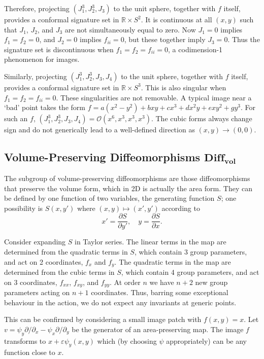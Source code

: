 \documentclass[review,onefignum,onetabnum]{siamonline190516}
\def\R{\mathbb{R}}
\begin{document}
{Therefore, projecting $(J_1^3,J_2^3,J_3)$ to the unit sphere, together with $f$ itself, provides a conformal signature set in $\R\times S^2$. It is continuous at all $(x,y)$ such that $J_1$, $J_2$, and $J_3$ are not simultaneously equal to zero.  Now $J_1=0$ implies $f_1=f_2=0$, and $J_2=0$ implies $f_{ii}=0$, but these together imply $J_3=0$. Thus the signature set is discontinuous when $f_1=f_2=f_{ii}=0$, a codimension-1 phenomenon for images.

Similarly, projecting $(J_1^3,J_2^3,J_3,J_4)$ to the unit sphere, together with $f$ itself, provides a conformal signature set in $\R\times S^3$. This is also singular when $f_1=f_2=f_{ii}=0$. These singularities are not removable. A typical image near a `bad' point takes the form $f = a(x^2-y^2) + b x y + c x^3 + d x^2 y + e x y^2 + g y^3$.  For such an $f$, $(J_1^3,J_2^3,J_3,J_4)=\mathcal{O}(x^6,x^3,x^3,x^3)$.  The cubic forms always change sign and do not generically lead to a well-defined direction as $(x,y)\to(0,0)$. 

\subsection{Volume-Preserving Diffeomorphisms $\mathbf{Diff_{vol}}$}

The subgroup of volume-preserving diffeomorphisms are those diffeomorphisms that preserve the volume form, which in 2D is actually the area form. They can be defined by one function of two variables, the generating function $S$; one possibility is $S(x,y')$ where $(x,y)\mapsto(x',y')$ according to
$$ x'=\frac{\partial S}{\partial y'},\quad y = \frac{\partial S}{\partial x}.$$

Consider expanding $S$ in Taylor series. The linear terms in the map are determined from the quadratic terms in $S$, which contain 3 group parameters, and act on 2 coordinates, $f_x$ and $f_y$.  The quadratic terms in the map are determined from the cubic terms in $S$, which contain 4 group parameters, and act on 3 coordinates, $f_{xx}$, $f_{xy}$, and $f_{yy}$. At order $n$ we have $n+2$ new group parameters acting on $n+1$ coordinates. Thus, barring some exceptional behaviour in the action, we do not expect any invariants at generic points.

This can be confirmed by considering a small image patch with $f(x,y)=x.$ Let $v=\psi_y\partial/\partial_x - \psi_x\partial/\partial_y$ be the generator of an area-preserving map. The image $f$ transforms to $x + \varepsilon \psi_y(x,y)$ which (by choosing $\psi$ appropriately) can be any function close to $x$.

}
\end{document}
